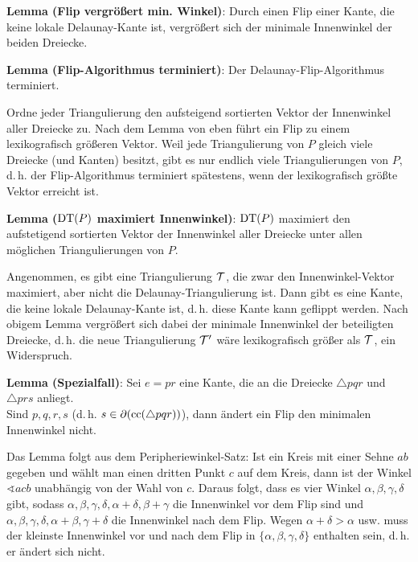 \linie

\textbf{Lemma (Flip vergrößert min. Winkel)}:
Durch einen Flip einer Kante, die keine lokale Delaunay-Kante ist,
vergrößert sich der minimale Innenwinkel der beiden Dreiecke.

\textbf{Lemma (Flip-Algorithmus terminiert)}:
Der Delaunay-Flip-Algorithmus terminiert.

\begin{Beweis}
    Ordne jeder Triangulierung den aufsteigend sortierten Vektor der Innenwinkel aller Dreiecke zu.
    Nach dem Lemma von eben führt ein Flip zu einem lexikografisch größeren Vektor.
    Weil jede Triangulierung von $P$ gleich viele Dreiecke (und Kanten) besitzt,
    gibt es nur endlich viele Triangulierungen von $P$, d.\,h.
    der Flip-Algorithmus terminiert spätestens, wenn der lexikografisch größte Vektor
    erreicht ist.
\end{Beweis}

\textbf{Lemma ($\operatorname{DT}(P)$ maximiert Innenwinkel)}:
$\operatorname{DT}(P)$ maximiert den aufstetigend sortierten Vektor der Innenwinkel aller
Dreiecke unter allen möglichen Triangulierungen von $P$.

\begin{Beweis}
    Angenommen, es gibt eine Triangulierung $\mathcal{T}$, die zwar den Innenwinkel-Vektor maximiert,
    aber nicht die Delaunay-Triangulierung ist.
    Dann gibt es eine Kante, die keine lokale Delaunay-Kante ist, d.\,h.
    diese Kante kann geflippt werden.
    Nach obigem Lemma vergrößert sich dabei der minimale Innenwinkel der beteiligten Dreiecke,
    d.\,h. die neue Triangulierung $\mathcal{T}'$ wäre lexikografisch größer als $\mathcal{T}$, ein Widerspruch.
\end{Beweis}

\textbf{Lemma (Spezialfall)}:
Sei $e = pr$ eine Kante, die an die Dreiecke $\triangle pqr$ und $\triangle prs$ anliegt.\\
Sind $p, q, r, s$  (d.\,h. $s \in \partial(\operatorname{cc}(\triangle pqr))$),
dann ändert ein Flip den minimalen Innenwinkel nicht.

\begin{Beweis}
    Das Lemma folgt aus dem Peripheriewinkel-Satz:
    Ist ein Kreis mit einer Sehne $ab$ gegeben und wählt man einen dritten Punkt $c$ auf dem Kreis,
    dann ist der Winkel $\sphericalangle acb$ unabhängig von der Wahl von $c$.
    Daraus folgt, dass es vier Winkel $\alpha, \beta, \gamma, \delta$ gibt,
    sodass $\alpha, \beta, \gamma, \delta, \alpha + \delta, \beta + \gamma$
    die Innenwinkel vor dem Flip sind und
    $\alpha, \beta, \gamma, \delta, \alpha + \beta, \gamma + \delta$
    die Innenwinkel nach dem Flip.
    Wegen $\alpha + \delta > \alpha$ usw.
    muss der kleinste Innenwinkel vor und nach dem Flip in $\{\alpha, \beta, \gamma, \delta\}$
    enthalten sein, d.\,h. er ändert sich nicht.
\end{Beweis}

